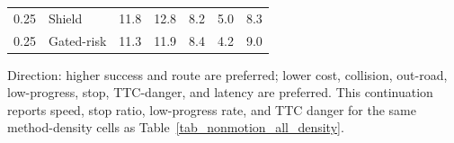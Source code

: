 \begin{table}[!htbp]
\begin{tabular}{@{}llrrrrr@{}}
0.25 & Shield & 11.8 & 12.8 & 8.2 & 5.0 & 8.3 \\
0.25 & Gated-risk & 11.3 & 11.9 & 8.4 & 4.2 & 9.0 \\
\bottomrule
\end{tabular}
\begin{tablenotes}
\item Direction: higher success and route are preferred; lower cost, collision, out-road, low-progress, stop, TTC-danger, and latency are preferred. This continuation reports speed, stop ratio, low-progress rate, and TTC danger for the same method-density cells as Table~\ref{tab_nonmotion_all_density}.
\end{tablenotes}
\end{table}
